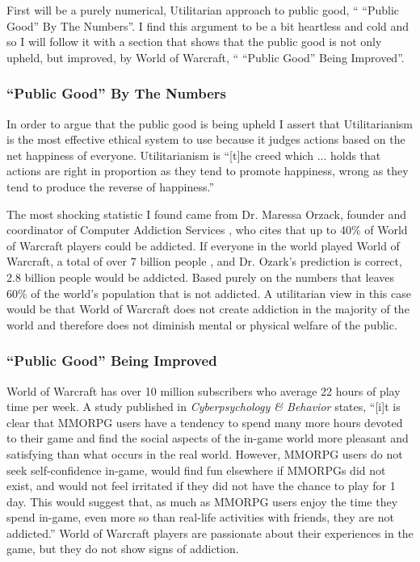 \documentclass[11pt]{article}
\begin{document}
\begin{multicols}{2}
First will be a purely numerical, Utilitarian approach to public good, `` ``Public Good'' By The Numbers''. I find this argument to be a bit heartless and cold and so I will follow it with a section that shows that the public good is not only upheld, but improved, by World of Warcraft, `` ``Public Good'' Being Improved''.

\subsubsection{``Public Good'' By The Numbers}
In order to argue that the public good is being upheld I assert that Utilitarianism is the most effective ethical system to use because it judges actions based on the net happiness of everyone. Utilitarianism is ``[t]he creed which ... holds that actions are right in proportion as they tend to promote happiness, wrong as they tend to produce the reverse of happiness.'' \cite{Utilitarianism}

The most shocking statistic I found came from Dr. Maressa Orzack, founder and coordinator of Computer Addiction Services \cite{CompAddictionServices}, who cites that up to 40\% of World of Warcraft players could be addicted. \cite{FortyPercentAddicted} If everyone in the world played World of Warcraft, a total of over 7 billion people \cite{WorldPopulation}, and Dr. Ozark's prediction is correct, 2.8 billion people would be addicted. Based purely on the numbers that leaves 60\% of the world's population that is not addicted. A utilitarian view in this case would be that World of Warcraft does not create addiction in the majority of the world and therefore does not diminish mental or physical welfare of the public.

\subsubsection{``Public Good'' Being Improved}
World of Warcraft has over 10 million subscribers \cite{WoWPlayerCount} who average 22 hours of play time per week. \cite{PlayerMotivations} A study published in \emph{Cyberpsychology \& Behavior} \cite{ExcessiveUseForSocialAspects} states, ``[i]t is clear that MMORPG users have a tendency to spend many more hours devoted to their game and find the social aspects of the in-game world more pleasant and satisfying than what occurs in the real world. However, MMORPG users do not seek self-confidence in-game, would find fun elsewhere if MMORPGs did not exist, and would not feel irritated if they did not have the chance to play for 1 day. This would suggest that, as much as MMORPG users enjoy the time they spend in-game, even more so than real-life activities with friends, they are not addicted.'' World of Warcraft players are passionate about their experiences in the game, but they do not show signs of addiction.


\end{multicols}
\end{document}
